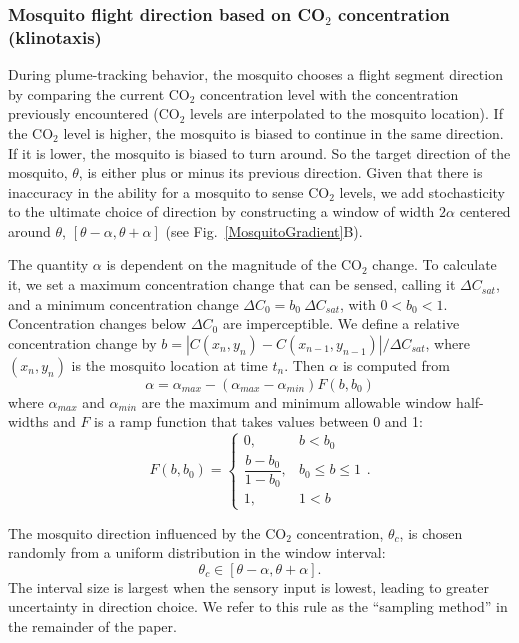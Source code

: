 \documentclass[10pt]{article}
\begin{document}
	

\subsubsection*{Mosquito flight direction based on CO$_2$ concentration (klinotaxis)}
During plume-tracking behavior, the mosquito chooses a flight segment direction by comparing the current CO$_2$ concentration level
with the concentration previously encountered (CO$_2$ levels are interpolated to the mosquito location).  If the CO$_2$ level is higher, the mosquito is biased to continue in the same direction. If it is lower, the mosquito is biased to turn around. So the target direction of the mosquito, $\theta$, is either plus or minus its previous direction.
Given that there is inaccuracy in the ability for a mosquito to sense CO$_2$ levels, 
we add stochasticity to the ultimate choice of direction by constructing a window of width $2\alpha$ centered around $\theta$, $[\theta-\alpha,\theta+\alpha]$ (see Fig.~\ref{MosquitoGradient}B).  

The quantity $\alpha$ is dependent on the magnitude of the CO$_2$ change. To calculate it, we set a maximum concentration
change that can be sensed, calling it $\Delta C_{sat}$, and a minimum concentration change $\Delta C_0 = b_0\ \Delta C_{sat}$, with $0<b_0<1$.  
Concentration changes below $\Delta C_0$ are imperceptible.  We define a relative concentration 
change by $b = |C(x_n,y_n)-C(x_{n-1},y_{n-1})|/\Delta C_{sat}$,
where $(x_n,y_n)$ is the mosquito location at time $t_n$.
%
Then $\alpha$ is computed from
\begin{equation} \label{eqn:response}
\alpha = \alpha_{max} - (\alpha_{max}-\alpha_{min}) F(b,b_0)
\end{equation}
where $\alpha_{max}$ and $\alpha_{min}$ are the maximum and minimum allowable window half-widths and $F$ is a
ramp function that takes values between 0 and 1:
\begin{equation*}
F(b, b_0) = \left\{ \begin{array}{lr}
   0, & b < b_0 \\
   \dfrac{b-b_0}{1 - b_0}, & b_0 \leq b \leq 1 \\
   1, & 1 < b
   \end{array}\right. .
 \end{equation*}

The mosquito direction influenced by the CO$_2$ concentration, $\theta_c$, is chosen randomly from a uniform distribution in the window interval: 
\begin{equation}
	\theta_c \in [\theta-\alpha,\theta+\alpha].\label{eqn:thetac}
\end{equation}
The interval size is largest when the sensory input is lowest, leading to greater uncertainty in direction choice. 
We refer to this rule as the ``sampling method'' in the remainder of the paper.
\end{document}
